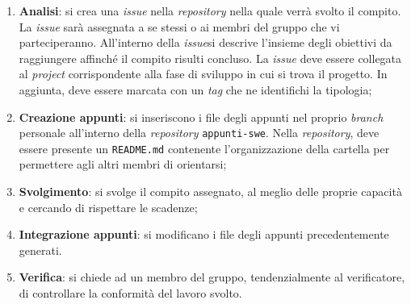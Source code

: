 \begin{enumerate}
	\item \textbf{Analisi}: si crea una \textit{issue\g} nella \textit{repository\g} nella quale verrà svolto il compito. 
		  La \textit{issue\g} sarà assegnata a se stessi o ai membri del gruppo che vi parteciperanno. 
		  All'interno della \textit{issue}\g si descrive l'insieme degli obiettivi da raggiungere affinché il compito risulti concluso.
	      La \textit{issue} deve essere collegata al \textit{project} corrispondente alla fase di sviluppo in cui si trova il progetto. 
		  In aggiunta, deve essere marcata con un \textit{tag} che ne identifichi la tipologia;

	\item \textbf{Creazione appunti}: si inseriscono i file degli
	      appunti nel proprio \textit{branch} personale all'interno
	      della \textit{repository\g} \texttt{appunti-swe}.
	      Nella \textit{repository\g}, deve essere presente un \texttt{README.md}
	      contenente l'organizzazione della cartella per permettere agli altri
	      membri di orientarsi;

	\item \textbf{Svolgimento}: si svolge il compito assegnato, al meglio
	      delle proprie capacità e cercando di rispettare le scadenze;

	\item \textbf{Integrazione appunti}: si modificano i file degli
	      appunti precedentemente generati.

	\item \textbf{Verifica}: si chiede ad un membro del gruppo,
	      tendenzialmente al verificatore, di controllare la conformità del
	      lavoro svolto.
\end{enumerate}

